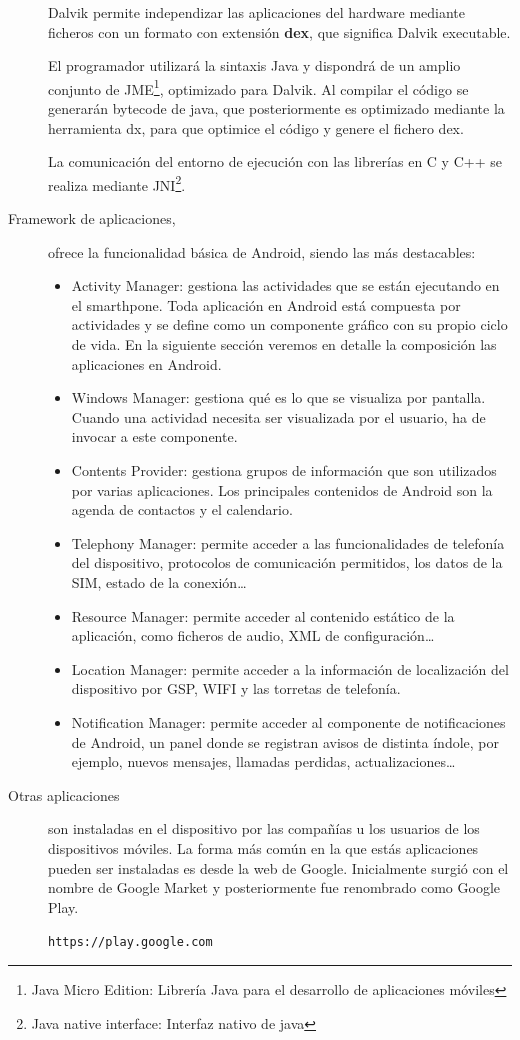 \begin{description}
Dalvik permite independizar las aplicaciones del hardware mediante ficheros con un formato con extensión \textbf{dex}, que significa Dalvik executable. 

El programador utilizará la sintaxis Java y dispondrá de un amplio conjunto de JME\footnote{Java Micro Edition: Librería Java para el desarrollo de aplicaciones móviles}, optimizado para Dalvik. Al compilar el código se generarán bytecode de java, que posteriormente es optimizado mediante la herramienta dx, para que optimice el código y genere el fichero dex. 

La comunicación del entorno de ejecución con las librerías en C y C++ se realiza mediante JNI\footnote{Java native interface: Interfaz nativo de java}.

\item [Framework de aplicaciones,] ofrece la funcionalidad básica de Android, siendo las más destacables:
\begin{itemize}
\item Activity Manager: gestiona las actividades que se están ejecutando en el smarthpone. Toda aplicación en Android está compuesta por actividades y se define como un componente gráfico con su propio ciclo de vida. En la siguiente sección veremos en detalle la composición las aplicaciones en Android.
\item Windows Manager: gestiona qué es lo que se visualiza por pantalla. Cuando una actividad necesita ser visualizada por el usuario, ha de invocar a este componente.
\item Contents Provider:  gestiona grupos de información que son utilizados por varias aplicaciones. Los principales contenidos de Android son la agenda de contactos y el calendario.
\item Telephony Manager: permite acceder a las funcionalidades de telefonía del dispositivo, protocolos de comunicación permitidos, los datos de la SIM, estado de la conexión\ldots
\item Resource Manager: permite acceder al contenido estático de la aplicación, como ficheros de audio, XML de configuración\ldots
\item Location Manager: permite acceder a la información de localización del dispositivo por GSP, WIFI y las torretas de telefonía.
\item Notification Manager: permite acceder al componente de notificaciones de Android, un panel donde se registran avisos de distinta índole, por ejemplo, nuevos mensajes, llamadas perdidas, actualizaciones\ldots
\end{itemize}

\item [Otras aplicaciones] son instaladas en el dispositivo por las compañías u los usuarios de los dispositivos móviles. La forma más común en la que estás aplicaciones pueden ser instaladas es desde la web de Google. Inicialmente surgió con el nombre de Google Market y posteriormente fue renombrado como Google Play. \begin{center}\texttt{https://play.google.com}\end{center}
\end{description}


